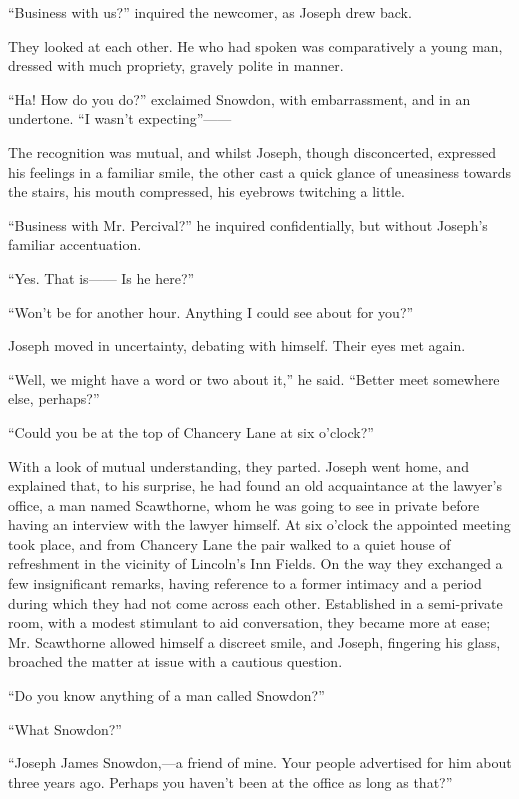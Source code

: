 ``Business with us?'' inquired the newcomer, as Joseph drew back.

They looked at each other. He who had spoken was comparatively a young
man, dressed with much propriety, gravely polite in manner.

``Ha! How do you do?'' exclaimed {\protect\hypertarget{88}{}{}}Snowdon,
with embarrassment, and in an undertone. ``I wasn't
expecting''{{------}}

The recognition was mutual, and whilst Joseph, though disconcerted,
expressed his feelings in a familiar smile, the other cast a quick
glance of uneasiness towards the stairs, his mouth compressed, his
eyebrows twitching a little.

``Business with Mr. Percival?'' he inquired confidentially, but without
Joseph's familiar accentuation.

``Yes. That is{{------}} Is he here?''

``Won't be for another hour. Anything I could see about for you?''

Joseph moved in uncertainty, debating with himself. Their eyes met
again.

``Well, we might have a word or two about it,'' he said. ``Better meet
somewhere else, perhaps?''

``Could you be at the top of Chancery Lane at six o'clock?''

With a look of mutual understanding, they parted. Joseph went home, and
explained that, to his surprise, he had found an
{\protect\hypertarget{89}{}{}}old acquaintance at the lawyer's office, a
man named Scawthorne, whom he was going to see in private before having
an interview with the lawyer himself. At six o'clock the appointed
meeting took place, and from Chancery Lane the pair walked to a quiet
house of refreshment in the vicinity of Lincoln's Inn Fields. On the way
they exchanged a few insignificant remarks, having reference to a former
intimacy and a period during which they had not come across each other.
Established in a semi-private room, with a modest stimulant to aid
conversation, they became more at ease; Mr. Scawthorne allowed himself a
discreet smile, and Joseph, fingering his glass, broached the matter at
issue with a cautious question.

``Do you know anything of a man called Snowdon?''

``What Snowdon?''

``Joseph James Snowdon,---a friend of mine. Your people advertised for
him about three years ago. Perhaps you haven't been at the office as
long as that?''

